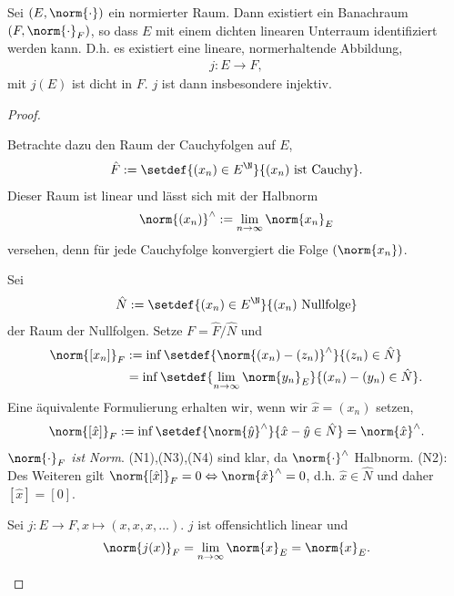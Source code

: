 \begin{prop}[Vervollständigung]
\label{prop:1.16}
Sei $(E,\norm{\cdot})$ ein normierter Raum. Dann existiert ein Banachraum
$(F,\norm{\cdot}_F)$, so dass $E$ mit einem dichten linearen Unterraum
identifiziert werden kann. D.h. es existiert eine lineare, normerhaltende
Abbildung,
\begin{align*}
j: E\to F,
\end{align*}
mit $j(E)$ ist dicht in $F$. $j$ ist dann insbesondere injektiv.\fishhere
\end{prop}
\begin{proof}
\begin{proofenum}
  \item Betrachte dazu den Raum der Cauchyfolgen auf $E$,
\begin{align*}
\hat{F} := \setdef{(x_n)\in E^\N}{(x_n)\text{ ist Cauchy}}.
\end{align*}
Dieser Raum ist linear und lässt sich mit der Halbnorm
\begin{align*}
\norm{(x_n)}^\land := \lim\limits_{n\to\infty} \norm{x_n}_E
\end{align*}
versehen, denn für jede Cauchyfolge konvergiert die Folge $(\norm{x_n})$.
\item Sei
\begin{align*}
\hat{N} := \setdef{(x_n)\in E^\N}{(x_n)\text{ Nullfolge}}
\end{align*}
der Raum der Nullfolgen. Setze $F=\hat{F}/\hat{N}$ und
\begin{align*}
\norm{[x_n]}_F &:= \inf\setdef{\norm{(x_n)-(z_n)}^\land}{(z_n)\in\hat{N}}\\
&= \inf\setdef{\lim\limits_{n\to\infty}\norm{y_n}_E}{(x_n)-(y_n)\in\hat{N}}.
\end{align*}
Eine äquivalente Formulierung erhalten wir, wenn wir $\hat{x}=(x_n)$ setzen,
\begin{align*}
\norm{[\hat{x}]}_F :=
\inf\setdef{\norm{\hat{y}}^\land}{\hat{x}-\hat{y}\in\hat{N}} =
\norm{\hat{x}}^\land.
\end{align*}
\textit{$\norm{\cdot}_F$ ist Norm}. (N1),(N3),(N4) sind klar, da
$\norm{\cdot}^\land$ Halbnorm. (N2): Des Weiteren gilt $\norm{[\hat{x}]}_F = 0\Leftrightarrow
\norm{\hat{x}}^\land = 0$, d.h. $\hat{x}\in\hat{N}$ und daher $[\hat{x}] = [0]$.
\item
Sei $j: E\to F, x\mapsto (x,x,x,\ldots)$. $j$ ist offensichtlich linear und
\begin{align*}
\norm{j(x)}_F = \lim\limits_{n\to\infty} \norm{x}_E = \norm{x}_E.

\end{align*}
\end{proofenum}
\end{proof}
